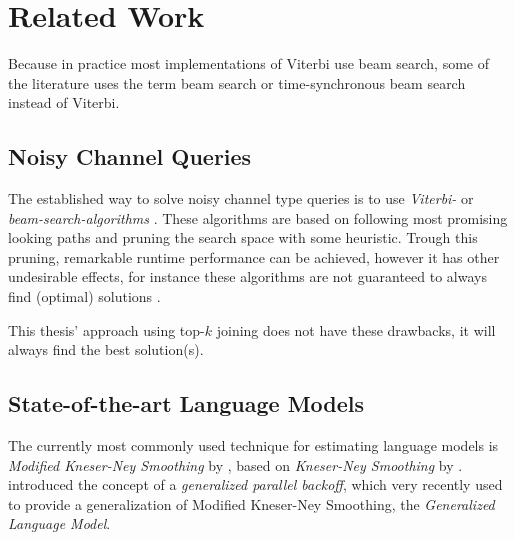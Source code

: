\chapter{Related Work}
\label{ch:relatedwork}

\begin{draft}
\begin{displayquote}
Because in practice most implementations of Viterbi use beam
search, some of the literature uses the term beam search or time-synchronous beam
search instead of Viterbi.
\end{displayquote}
\end{draft}

\section{Noisy Channel Queries}

The established way to solve noisy channel type queries is to use
\emph{Viterbi-} or \emph{beam-search-algorithms}
\parencite{JurafskyMartin2009,Bickel2005}.
These algorithms are based on following most promising looking paths and
pruning the search space with some heuristic.
Trough this pruning, remarkable runtime performance can be achieved, however it
has other undesirable effects, for instance these algorithms are not guaranteed
to always find (optimal) solutions \parencite{Bickel2005}.

This thesis' approach using top-$k$ joining does not have these drawbacks, it
will always find the best solution(s).

\section{State-of-the-art Language Models}

The currently most commonly used \parencite{JurafskyMartin2009,Chelba2013}
technique for estimating language models is \emph{Modified Kneser-Ney Smoothing}
by \textcite{ChenGoodman1996,ChenGoodman1998,ChenGoodman1999}, based on
\emph{Kneser-Ney Smoothing} by \textcite{KneserNey1995}.
\textcite{BilmesKirchhoff2003} introduced the concept of a \emph{generalized
parallel backoff}, which very recently \textcite{Pickhardt2014} used to provide
a generalization of Modified Kneser-Ney Smoothing, the \emph{Generalized
Language Model}.

